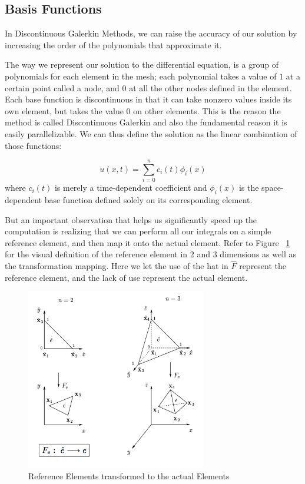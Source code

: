 \subsection{Basis Functions}

In Discontinuous Galerkin Methods, we can raise the accuracy of our solution by increasing the order of the polynomials that approximate it. 

The way we represent our solution to the differential equation, is a group of polynomials for each element in the mesh; each polynomial takes a value of $1$ at a certain point called a node, and $0$ at all the other nodes defined in the element. Each base function is discontinuous in that it can take nonzero values inside its own element, but takes the value $0$ on other elements. This is the reason the method is called Discontinuous Galerkin and also the fundamental reason it is easily parallelizable. We can thus define the solution as the linear combination of those functions:

$$u(x,t) = \sum\limits_{i=0}^n c_i(t)\phi_i(x)$$ 
where $c_i(t)$ is merely a time-dependent coefficient and $\phi_i(x)$ is the space-dependent base function defined solely on its corresponding element.


But an important observation that helps us significantly speed up the computation is realizing that we can perform all our integrals on a simple reference element, and then map it onto the actual element. Refer to Figure ~\ref{fig:Reference-Elements} for the visual definition of the reference element in 2 and 3 dimensions as well as the transformation mapping. Here we let the use of the hat in $\hat{F}$ represent the reference element, and the lack of use represent the actual element.


\begin{figure}[ht]
	\centering
	\includegraphics[width=0.7\textwidth]{Images/Reference-Elements.png}
	\caption{Reference Elements transformed to the actual Elements}
	\label{fig:Reference-Elements}
\end{figure}


